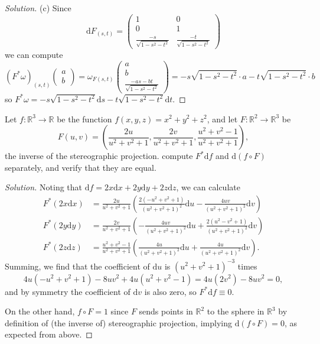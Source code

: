 \documentclass[10pt]{article}
\newcommand{\dd}{\mathrm{d}}
\providecommand{\RR}{\mathbb R}
\newenvironment{soln}{\begin{proof}[Solution]}{\end{proof}}
\begin{document}
\begin{soln}
    (c) Since
    \begin{equation*}
	\dd F_{(s,t)} = \begin{pmatrix}
	    1&0\\0&1\\
	    \frac{-s}{\sqrt{1-s^2-t^2}}&
	    \frac{-t}{\sqrt{1-s^2-t^2}}
	\end{pmatrix}
    \end{equation*}
    we can compute
    \begin{equation*}
	(F^*\omega)_{(s,t)}\begin{pmatrix}
	    a\\b
	\end{pmatrix}
	= \omega_{F(s,t)}\begin{pmatrix}
	    a\\b\\\frac{-as-bt}{\sqrt{1-s^2-t^2}}
	\end{pmatrix}
	= -s\sqrt{1-s^2-t^2}\cdot a - t\sqrt{1-s^2-t^2}\cdot b
    \end{equation*}
    so $F^*\omega = -s\sqrt{1-s^2-t^2}\dd s
    - t\sqrt{1-s^2-t^2}\dd t$.
\end{soln}

\begin{problem}
    [11-9]
    Let $f\colon\RR^3\to\RR$ be the function
    $f(x,y,z) = x^2 + y^2 + z^2$, and let
    $F\colon\RR^2\to\RR^3$ be
    \begin{equation*}
	F(u,v) = \left(\frac{2u}{u^2+v^2+1}, \frac{2v}{u^2+v^2+1},
	\frac{u^2+v^2-1}{u^2+v^2+1}\right),
    \end{equation*}
    the inverse of the stereographic projection.
    compute $F^*\dd f$ and $\dd(f\circ F)$ separately,
    and verify that they are equal.
\end{problem}

\begin{soln}
    Noting that $\dd f = 2x\dd x + 2y\dd y + 2z\dd z$, we can calculate
    \begin{align*}
        F^*(2x\dd x)
	&= \frac{2u}{u^2+v^2+1}\left(\frac{2(-u^2+v^2+1)}{(u^2+v^2+1)^2}\dd u
	- \frac{4uv}{(u^2+v^2+1)^2}\dd v\right)\\
        F^*(2y\dd y)
	&= \frac{2v}{u^2+v^2+1}\left(- \frac{4uv}{(u^2+v^2+1)^2}\dd u
	+ \frac{2(u^2-v^2+1)}{(u^2+v^2+1)^2}\dd v\right)\\
        F^*(2z\dd z)
	&= \frac{u^2+v^2-1}{u^2+v^2+1}\left(\frac{4u}{(u^2+v^2+1)^2}\dd u
	+ \frac{4u}{(u^2+v^2+1)^2}\dd v\right).
    \end{align*}
    Summing, we find that the coefficient of $\dd u$ is
    $(u^2+v^2+1)^{-3}$ times
    \begin{equation*}
        4u(-u^2+v^2+1) - 8uv^2 + 4u(u^2+v^2-1)
	= 4u(2v^2) - 8uv^2 = 0,
    \end{equation*}
    and by symmetry the coefficient of $\dd v$ is also zero,
    so $F^*\dd f \equiv 0$.

    On the other hand, $f\circ F = 1$
    since $F$ sends points in $\RR^2$ to the sphere in $\RR^3$
    by definition of (the inverse of) stereographic projection,
    implying $\dd(f\circ F) = 0$, as expected from above.
\end{soln}
\end{document}
